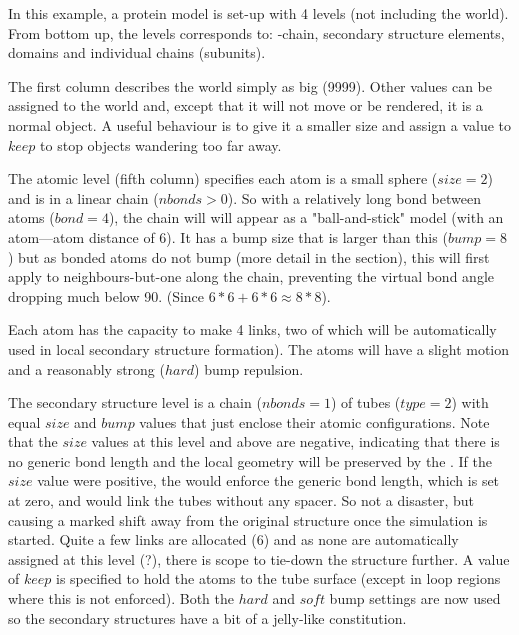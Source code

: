 In this example, a protein model is set-up with 4 levels (not including the world).
From bottom up, the levels corresponds to: \CA-chain, secondary structure elements,
domains and individual chains (subunits). 

The first column describes the world simply as big (9999).  Other values can be assigned to
the world and, except that it will not move or be rendered, it is a normal object.
A useful behaviour is to give it a smaller size and assign a value to $keep$ to stop
objects wandering too far away. 

The atomic level (fifth column) specifies each atom is a small sphere ($size = 2$) and is in
a linear chain ($nbonds > 0$).  So with a relatively long bond between atoms ($bond = 4$),
the chain will will appear as a "ball-and-stick" model (with an atom---atom distance of 6). 
It has a bump size that is larger than this ($bump = 8$) but as bonded atoms do not bump (more
detail in the  section), this will first apply to neighbours-but-one along the chain,
preventing the virtual bond angle dropping much below 90\degree. (Since $6*6+6*6 \approx 8*8$).

Each atom has the capacity to make 4 links, two of which will be automatically used in local
secondary structure formation).  The atoms will have a slight motion and a reasonably strong
($hard$) bump repulsion.

The secondary structure level is a chain ($nbonds = 1$) of tubes ($type = 2$) with equal
$size$ and $bump$ values that just enclose their atomic configurations. Note that the $size$
values at this level and above are negative, indicating that there is no generic bond length 
and the local geometry will be preserved by the .   If the $size$ value were positive,
the  would enforce the generic bond length, which is set at zero, and would link
the tubes without any spacer.  So not a disaster, but causing a marked shift away from
the original structure once the simulation is started.  Quite a few links are allocated (6)
and as none are automatically assigned at this level (?), there is scope to tie-down the 
structure further.  A value of $keep$ is specified to hold the atoms to the tube surface
(except in loop regions where this is not enforced).
Both the $hard$ and $soft$ bump settings are now used so the secondary
structures have a bit of a jelly-like constitution.

